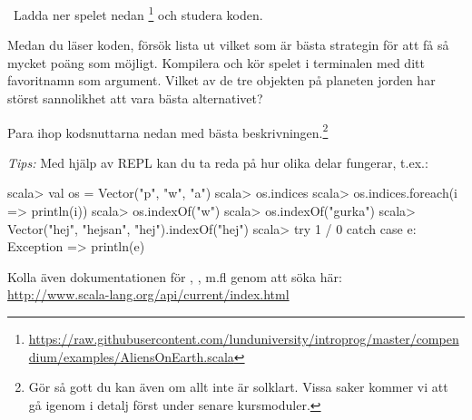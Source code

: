 \Task  \what~Ladda ner spelet nedan \footnote{
\url{https://raw.githubusercontent.com/lunduniversity/introprog/master/compendium/examples/AliensOnEarth.scala}} och studera koden.


%

\Subtask Medan du läser koden, försök lista ut vilket som är bästa strategin för att få så mycket poäng som möjligt. Kompilera och kör spelet i terminalen med ditt favoritnamn som argument. Vilket av de tre objekten på planeten jorden har störst sannolikhet att vara bästa alternativet?

\Subtask Para ihop kodsnuttarna nedan med bästa beskrivningen.\footnote{Gör så gott du kan även om allt inte är solklart. Vissa saker kommer vi att gå igenom i detalj först under senare kursmoduler.}

\begin{ConceptConnections}

\end{ConceptConnections}

\noindent\emph{Tips:} Med hjälp av REPL kan du ta reda på hur olika delar fungerar, t.ex.:

\begin{REPL}
scala> val os = Vector("p", "w", "a")
scala> os.indices
scala> os.indices.foreach(i => println(i))
scala> os.indexOf("w")
scala> os.indexOf("gurka")
scala> Vector("hej", "hejsan", "hej").indexOf("hej")
scala> try 1 / 0 catch case e: Exception => println(e)
\end{REPL}
Kolla även dokumentationen för , , m.fl genom att söka
här: \\ \url{http://www.scala-lang.org/api/current/index.html}



